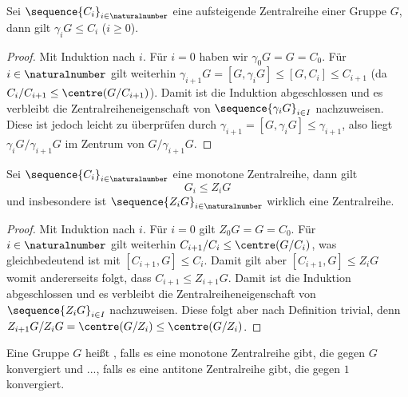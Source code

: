 \begin{lemma}
    Sei $\sequence{C_i}_{i\in\naturalnumber}$ eine aufsteigende Zentralreihe einer Gruppe $G$, dann gilt $\gamma_i G\leq C_i$ ($i\geq 0$). 
\end{lemma}

\begin{proof}
    Mit Induktion nach $i$. Für $i=0$ haben wir $\gamma_0 G= G= C_0$. 
    Für $i\in\naturalnumber$ gilt weiterhin $\gamma_{i+1} G = [G,\gamma_i G]\leq [G,C_i]\leq C_{i+1}$ (da $C_i/C_{i+1}\leq \centre
    (G/C_{i+1})$). Damit ist die Induktion abgeschlossen und es verbleibt die Zentralreiheneigenschaft von $\sequence{\gamma_i G}_{i\in
        I}$ nachzuweisen.
    Diese ist jedoch leicht zu überprüfen durch $\gamma_{i+1}=[G, \gamma_i G]\leq \gamma_{i+1}$, also liegt $\gamma_i
    G/\gamma_{i+1} G$ im Zentrum von $G/\gamma_{i+1} G$.    
\end{proof}


\begin{lemma}
    Sei $\sequence{C_i}_{i\in\naturalnumber}$ eine monotone Zentralreihe, dann gilt
    $$
    G_i\leq Z_i G
    $$
    und insbesondere ist $\sequence{Z_i G}_{i\in\naturalnumber}$ wirklich eine Zentralreihe.
\end{lemma}

\begin{proof}
    Mit Induktion nach $i$. Für $i=0$ gilt $Z_0 G = G = C_0$. Für $i\in\naturalnumber$ gilt weiterhin $C_{i+1}/C_i\leq\centre (G/C_i)$, was
    gleichbedeutend ist mit $[C_{i+1},G]\leq C_i$. Damit gilt aber $[C_{i+1},G]\leq Z_i G$ womit andererseits folgt, dass
    $C_{i+1}\leq Z_{i+1} G$. Damit ist die Induktion abgeschlossen und es verbleibt die Zentralreiheneigenschaft von $\sequence{Z_i
        G}_{i\in I}$ nachzuweisen. Diese folgt aber nach Definition trivial, denn $Z_{i+1} G/Z_i G=\centre (G/Z_i)\leq\centre(G/Z_i)$.
\end{proof}

\begin{definition}[Nilpotenz]
    Eine Gruppe $G$ heißt , falls es eine monotone Zentralreihe gibt, die gegen $G$ konvergiert und
    ..., falls es eine antitone Zentralreihe gibt, die gegen $1$ konvergiert. 
\end{definition}

